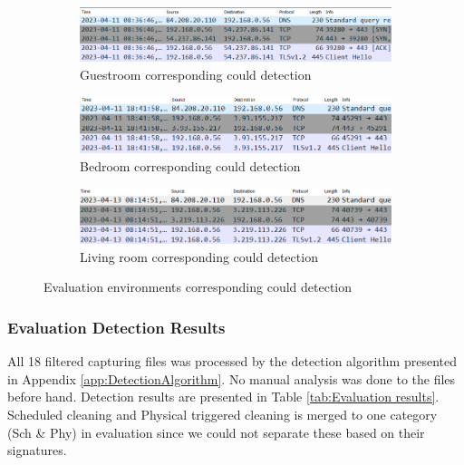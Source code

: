 \begin{figure}[H]
    \centering
    
    \begin{subfigure}{0.80\textwidth}
        \centering
        \includegraphics[width=\linewidth]{figures/Evaluation_cloud_detection1.png}
        \caption{Guestroom corresponding could detection}
        \label{fig:Evaluation_coulddetection_1}
    \end{subfigure}
    \hfill
    \begin{subfigure}{0.80\textwidth}
        \centering
        \includegraphics[width=\linewidth]{figures/Evaluation_cloud_detection2.png}
        \caption{Bedroom corresponding could detection}
        \label{fig:Evaluation_clouddetection_2}
    \end{subfigure}
    \hfill
    \begin{subfigure}{0.80\textwidth}
        \centering
        \includegraphics[width=\linewidth]{figures/Evaluation_cloud_detection3.png}
        \caption{Living room corresponding could detection}
        \label{fig:Evaluation_clouddetection_3}
    \end{subfigure}
    
    \caption{Evaluation environments corresponding could detection}
    \label{fig:evaluation_corresponding_cloud}
\end{figure}

\subsubsection{Evaluation Detection Results}
All 18 filtered capturing files was processed by the detection algorithm presented in Appendix \ref{app:DetectionAlgorithm}. No manual analysis was done to the files before hand. Detection results are presented in Table \ref{tab:Evaluation results}. Scheduled cleaning and Physical triggered cleaning is merged to one category (Sch \& Phy) in evaluation since we could not separate these based on their signatures. 

